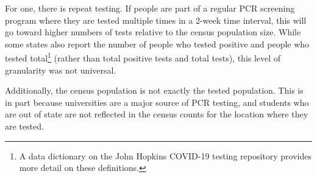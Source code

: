 \documentclass[12pt,twoside]{smiththesis}
\begin{document}
For one, there is repeat testing. If people are part of a regular PCR screening program where they are tested multiple times in a 2-week time interval, this will go toward higher numbers of tests relative to the census population size. While some states also report the number of people who tested positive and people who tested total\footnote{A data dictionary on the John Hopkins COVID-19 testing repository provides more detail on these definitions.} (rather than total positive tests and total tests), this level of granularity was not universal.

Additionally, the census population is not exactly the tested population. This is in part because universities are a major source of PCR testing, and students who are out of state are not reflected in the census counts for the location where they are tested.
\end{document}
